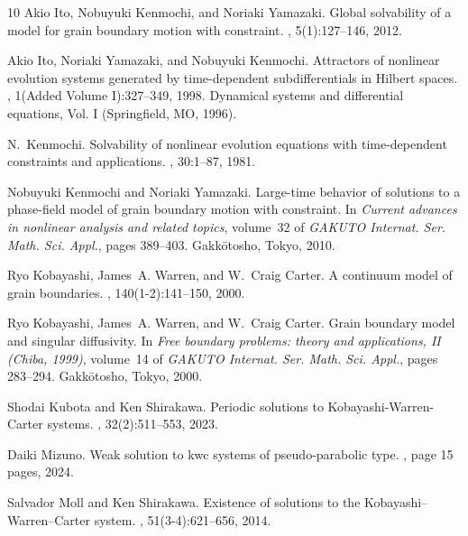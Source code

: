 \documentclass{sinst}
\numberwithin{equation}{section}
\theoremstyle{plain}
\theoremstyle{definition}
\begin{document}
\begin{thebibliography}{10}
Akio Ito, Nobuyuki Kenmochi, and Noriaki Yamazaki.
\newblock Global solvability of a model for grain boundary motion with
  constraint.
, 5(1):127--146, 2012.

Akio Ito, Noriaki Yamazaki, and Nobuyuki Kenmochi.
\newblock Attractors of nonlinear evolution systems generated by time-dependent
  subdifferentials in {H}ilbert spaces.
, 1(Added Volume I):327--349,
  1998.
\newblock Dynamical systems and differential equations, Vol. I (Springfield,
  MO, 1996).

N.~Kenmochi.
\newblock Solvability of nonlinear evolution equations with time-dependent
  constraints and applications.
, 30:1--87, 1981.

Nobuyuki Kenmochi and Noriaki Yamazaki.
\newblock Large-time behavior of solutions to a phase-field model of grain
  boundary motion with constraint.
\newblock In {\em Current advances in nonlinear analysis and related topics},
  volume~32 of {\em GAKUTO Internat. Ser. Math. Sci. Appl.}, pages 389--403.
  Gakk\=otosho, Tokyo, 2010.

Ryo Kobayashi, James~A. Warren, and W.~Craig Carter.
\newblock A continuum model of grain boundaries.
, 140(1-2):141--150, 2000.

Ryo Kobayashi, James~A. Warren, and W.~Craig Carter.
\newblock Grain boundary model and singular diffusivity.
\newblock In {\em Free boundary problems: theory and applications, {II}
  ({C}hiba, 1999)}, volume~14 of {\em GAKUTO Internat. Ser. Math. Sci. Appl.},
  pages 283--294. Gakk\=otosho, Tokyo, 2000.

Shodai Kubota and Ken Shirakawa.
\newblock Periodic solutions to {K}obayashi-{W}arren-{C}arter systems.
, 32(2):511--553, 2023.

Daiki Mizuno.
\newblock Weak solution to kwc systems of pseudo-parabolic type.
, page 15 pages, 2024.

Salvador Moll and Ken Shirakawa.
\newblock Existence of solutions to the {K}obayashi--{W}arren--{C}arter system.
, 51(3-4):621--656,
  2014.


\end{thebibliography}
\end{document}
